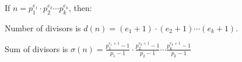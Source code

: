 If $n = p_1^{e_1} \cdot p_2^{e_2} \cdots p_k^{e_k}$, then:

Number of divisors is $d(n) = (e_1 + 1) \cdot (e_2 + 1) \cdots (e_k + 1)$.

Sum of divisors is $\sigma(n) = \frac{p_1^{e_1 + 1} - 1}{p_1 - 1} \cdot \frac{p_2^{e_2 + 1} - 1}{p_2 - 1} \cdots \frac{p_k^{e_k + 1} - 1}{p_k - 1}$
